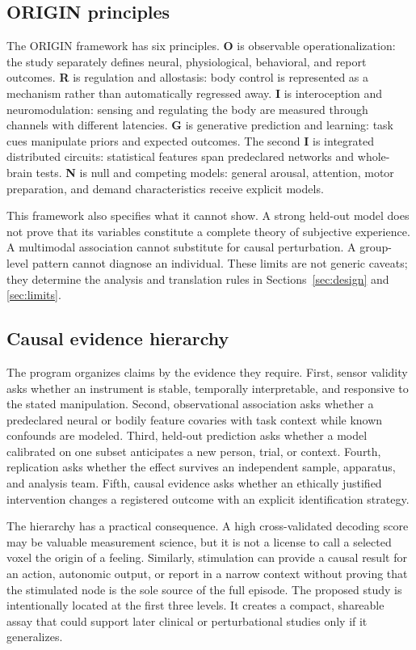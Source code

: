 \documentclass[conference]{IEEEtran}
\begin{document}
\subsection{ORIGIN principles}

The ORIGIN framework has six principles. \textbf{O} is observable operationalization: the study separately defines neural, physiological, behavioral, and report outcomes. \textbf{R} is regulation and allostasis: body control is represented as a mechanism rather than automatically regressed away. \textbf{I} is interoception and neuromodulation: sensing and regulating the body are measured through channels with different latencies. \textbf{G} is generative prediction and learning: task cues manipulate priors and expected outcomes. The second \textbf{I} is integrated distributed circuits: statistical features span predeclared networks and whole-brain tests. \textbf{N} is null and competing models: general arousal, attention, motor preparation, and demand characteristics receive explicit models.

This framework also specifies what it cannot show. A strong held-out model does not prove that its variables constitute a complete theory of subjective experience. A multimodal association cannot substitute for causal perturbation. A group-level pattern cannot diagnose an individual. These limits are not generic caveats; they determine the analysis and translation rules in Sections~\ref{sec:design} and \ref{sec:limits}.

\subsection{Causal evidence hierarchy}

The program organizes claims by the evidence they require. First, sensor validity asks whether an instrument is stable, temporally interpretable, and responsive to the stated manipulation. Second, observational association asks whether a predeclared neural or bodily feature covaries with task context while known confounds are modeled. Third, held-out prediction asks whether a model calibrated on one subset anticipates a new person, trial, or context. Fourth, replication asks whether the effect survives an independent sample, apparatus, and analysis team. Fifth, causal evidence asks whether an ethically justified intervention changes a registered outcome with an explicit identification strategy.

The hierarchy has a practical consequence. A high cross-validated decoding score may be valuable measurement science, but it is not a license to call a selected voxel the origin of a feeling. Similarly, stimulation can provide a causal result for an action, autonomic output, or report in a narrow context without proving that the stimulated node is the sole source of the full episode. The proposed study is intentionally located at the first three levels. It creates a compact, shareable assay that could support later clinical or perturbational studies only if it generalizes.
\end{document}
